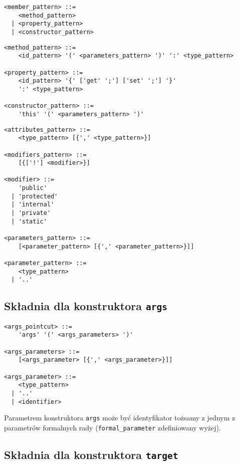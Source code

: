 \documentclass[a4paper,12pt]{mwbk}
\begin{document}
\begin{lstlisting}[style=grammar]
<member_pattern> ::=
    <method_pattern>
  | <property_pattern>
  | <constructor_pattern>
\end{lstlisting}


\begin{lstlisting}[style=grammar]
<method_pattern> ::=
    <id_pattern> '(' <parameters_pattern> ')' ':' <type_pattern>

<property_pattern> ::=
    <id_pattern> '{' ['get' ';'] ['set' ';'] '}' 
    ':' <type_pattern>

<constructor_pattern> ::=
    'this' '(' <parameters_pattern> ')'
\end{lstlisting}


\begin{lstlisting}[style=grammar]
<attributes_pattern> ::=
    <type_pattern> [{',' <type_pattern>}]    

<modifiers_pattern> ::=
    [{['!'] <modifier>}]

<modifier> ::=
    'public'
  | 'protected'
  | 'internal'
  | 'private'
  | 'static'

<parameters_pattern> ::=
    [<parameter_pattern> [{',' <parameter_pattern>}]]

<parameter_pattern> ::=
    <type_pattern>
  | '..'
\end{lstlisting}


\subsection{Składnia dla konstruktora \lstinline!args!}

\begin{lstlisting}[style=grammar]
<args_pointcut> ::=
    'args' '(' <args_parameters> ')'

<args_parameters> ::=
    [<args_parameter> [{',' <args_parameter>}]]

<args_parameter> ::=
    <type_pattern>
  | '..'
  | <identifier>
\end{lstlisting}

Parametrem konstruktora \lstinline!args! może być identyfikator tożsamy z
jednym z parametrów formalnych rady (\lstinline!formal_parameter! zdefiniowany
wyżej).

\subsection{Składnia dla konstruktora \lstinline!target!}
\end{document}
